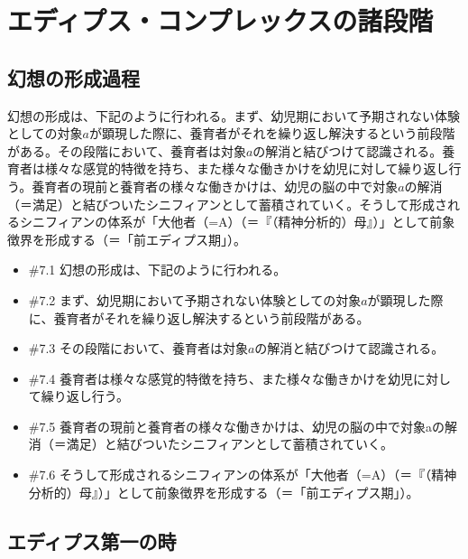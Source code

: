 \section{エディプス・コンプレックスの諸段階}\label{ux30a8ux30c7ux30a3ux30d7ux30b9ux30b3ux30f3ux30d7ux30ecux30c3ux30afux30b9ux306eux8af8ux6bb5ux968e}

\subsection{幻想の形成過程}\label{ux5e7bux60f3ux306eux5f62ux6210ux904eux7a0b}

幻想の形成は、下記のように行われる。まず、幼児期において予期されない体験としての対象\(a\)が顕現した際に、養育者がそれを繰り返し解決するという前段階がある。その段階において、養育者は対象\(a\)の解消と結びつけて認識される。養育者は様々な感覚的特徴を持ち、また様々な働きかけを幼児に対して繰り返し行う。養育者の現前と養育者の様々な働きかけは、幼児の脳の中で対象\(a\)の解消（＝満足）と結びついたシニフィアンとして蓄積されていく。そうして形成されるシニフィアンの体系が「大他者（=A）（＝『（精神分析的）母』）」として前象徴界を形成する（＝「前エディプス期」）。

\begin{note}{}
  \begin{itemize}
    \tightlist
    \item{\#7.1}
      幻想の形成は、下記のように行われる。
    \item{\#7.2}
      まず、幼児期において予期されない体験としての対象$a$が顕現した際に、養育者がそれを繰り返し解決するという前段階がある。
    \item{\#7.3}
      その段階において、養育者は対象$a$の解消と結びつけて認識される。
    \item{\#7.4}
      養育者は様々な感覚的特徴を持ち、また様々な働きかけを幼児に対して繰り返し行う。
    \item{\#7.5}
      養育者の現前と養育者の様々な働きかけは、幼児の脳の中で対象aの解消（＝満足）と結びついたシニフィアンとして蓄積されていく。
    \item{\#7.6}
      そうして形成されるシニフィアンの体系が「大他者（=A）（＝『（精神分析的）母』）」として前象徴界を形成する（＝「前エディプス期」）。
  \end{itemize}
\end{note}

\subsection{エディプス第一の時}\label{ux30a8ux30c7ux30a3ux30d7ux30b9ux7b2cux4e00ux306eux6642}

